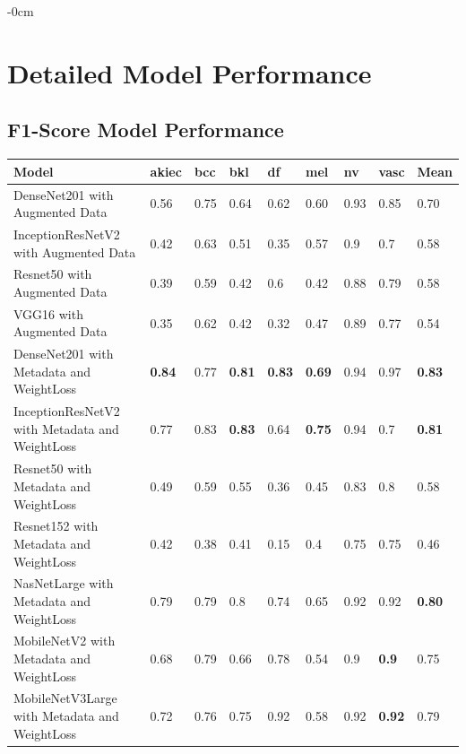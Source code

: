 \documentclass[sensors,article,submit,pdftex,moreauthors]{Definitions/mdpi}
\begin{document}
	\begin{adjustwidth}{-\extralength}{0cm}
		
		\section[\appendixname~\thesection]{Detailed Model Performance}
		\subsection[\appendixname~\thesection]{F1-Score Model Performance}
		\begin{table}[H]
			\centering
			\begin{tabular}{|p{5cm} | p{0.6cm} | p{0.6cm} | p{0.6cm} | p{0.6cm} | p{0.6cm} | p{0.6cm} | p{0.6cm} | p{0.7cm}|} 
				\hline
				Model & akiec & bcc & bkl & df & mel & nv & vasc & Mean \\
				\hline
				DenseNet201 with Augmented Data & 0.56 & 0.75 & 0.64 & 0.62 & 0.60 & 0.93 & 0.85 & 0.70 \\ 
				\hline
				InceptionResNetV2 with Augmented Data & 0.42 &	0.63 & 0.51 & 0.35 & 0.57 & 0.9 & 0.7 & 0.58\\
				\hline
				Resnet50 with Augmented Data & 0.39 & 0.59 & 0.42 & 0.6 & 0.42 & 0.88 & 0.79 & 0.58\\
				\hline 	
				VGG16 with Augmented Data & 0.35 & 0.62 & 0.42 & 0.32 & 0.47 & 0.89 & 0.77 & 0.54\\ 
				\hline		
				DenseNet201 with Metadata and WeightLoss & \textbf{0.84} & 0.77 & \textbf{0.81} & \textbf{0.83} & \textbf{0.69} & 0.94 & 0.97 & \textbf{0.83}\\
				\hline
				InceptionResNetV2 with Metadata and WeightLoss & 0.77 & 0.83 & \textbf{0.83} & 0.64 & \textbf{0.75} & 0.94 & 0.7 & \textbf{0.81}\\
				\hline
				Resnet50 with Metadata and WeightLoss & 0.49 & 0.59 & 0.55 & 0.36 & 0.45 & 0.83 & 0.8 & 0.58\\
				\hline
				Resnet152 with Metadata and WeightLoss & 0.42 & 0.38 & 0.41 & 0.15 & 0.4 & 0.75 & 0.75 & 0.46\\
				\hline
				NasNetLarge with Metadata and WeightLoss & 0.79 & 0.79 & 0.8 & 0.74 & 0.65 & 0.92 & 0.92 & \textbf{0.80}\\
				\hline
				MobileNetV2 with Metadata and WeightLoss & 0.68 & 0.79 & 0.66 & 0.78 & 0.54 & 0.9 & \textbf{0.9} & 0.75\\
				\hline
				MobileNetV3Large with Metadata and WeightLoss & 0.72 & 0.76 & 0.75 & 0.92 & 0.58 & 0.92 & \textbf{0.92} & 0.79\\

\end{tabular}
\end{table}
\end{adjustwidth}
\end{document}
